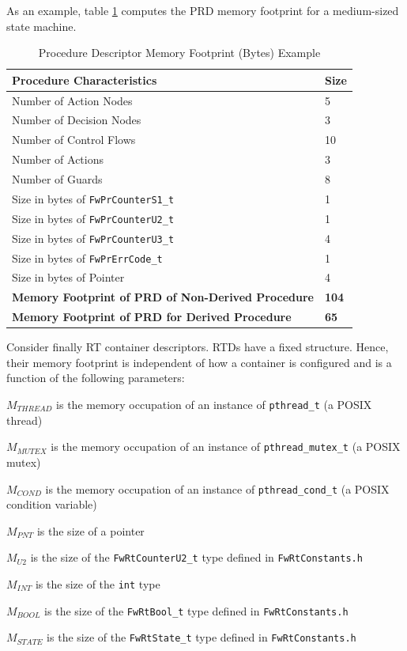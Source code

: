 \documentclass[manual]{../fwprofile}
\begin{document}
As an example, table \ref{tab:prdMemFootprintExample} computes the PRD memory footprint for a 
medium-sized state machine. 

\begin{longtable}{|l|l|}
\caption{Procedure Descriptor Memory Footprint (Bytes) Example} \label{tab:prdMemFootprintExample}\\
\hline
\rowcolor{gray}
\textbf{Procedure Characteristics} & \textbf{Size} \\
\hline\hline
Number of Action Nodes & 5 \\
\hline
Number of Decision Nodes & 3 \\
\hline
Number of Control Flows & 10 \\
\hline
Number of Actions & 3 \\
\hline
Number of Guards & 8 \\
\hline
Size in bytes of \texttt{FwPrCounterS1\_t} & 1 \\
\hline
Size in bytes of \texttt{FwPrCounterU2\_t} & 1 \\
\hline
Size in bytes of \texttt{FwPrCounterU3\_t} & 4 \\
\hline
Size in bytes of \texttt{FwPrErrCode\_t} & 1 \\
\hline
Size in bytes of Pointer & 4 \\
\hline
\textbf{Memory Footprint of PRD of Non-Derived Procedure} & \textbf{104} \\
\hline
\textbf{Memory Footprint of PRD for Derived Procedure} & \textbf{65} \\
\hline
\end{longtable}


Consider finally RT container descriptors. RTDs have a fixed structure. Hence, their memory footprint is independent of how a container is configured and is a function of the following parameters:

\begin{fw_itemize}
\item {$M_{THREAD}$} is the memory occupation of an instance of \texttt{pthread\_t} (a POSIX thread)
\item {$M_{MUTEX}$} is the memory occupation of an instance of \texttt{pthread\_mutex\_t} (a POSIX mutex)
\item {$M_{COND}$} is the memory occupation of an instance of \texttt{pthread\_cond\_t} (a POSIX condition variable)
\item {$M_{PNT}$} is the size of a pointer 
\item {$M_{U2}$} is the size of the \texttt{FwRtCounterU2\_t} type defined in \texttt{FwRtConstants.h} 
\item {$M_{INT}$} is the size of the \texttt{int} type 
\item {$M_{BOOL}$} is the size of the \texttt{FwRtBool\_t} type defined in \texttt{FwRtConstants.h} 
\item {$M_{STATE}$} is the size of the \texttt{FwRtState\_t} type defined in \texttt{FwRtConstants.h} 
\end{fw_itemize}
\end{document}
